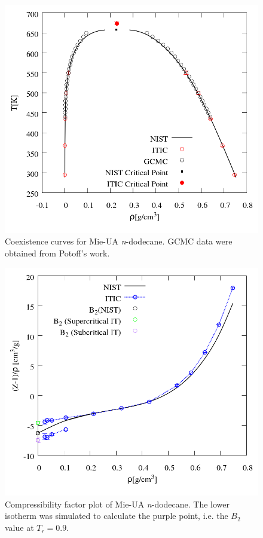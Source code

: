 \documentclass[%
 aip,
 jcp,
 sd,%
 amsmath,amssymb,
 reprint,%
]{revtex4-1}
\begin{document}
\begin{figure}
\includegraphics[scale=0.30]{Figures/EXAMPLE-SIM_Mie-C12_trho.png}
\caption{Coexistence curves for Mie-UA \textit{n}-dodecane. GCMC data were obtained from Potoff's work\cite{Potoff2009}.}
\label{fig:EXAMPLE-SIM/Mie-C12/T_rho}
\end{figure}

\begin{figure}
\includegraphics[scale=0.30]{Figures/EXAMPLE-SIM_Mie-C12_zrho.png}
\caption{Compressibility factor plot of Mie-UA \textit{n}-dodecane. The lower isotherm was simulated to calculate the purple point, i.e. the $B_2$ value at $T_r=0.9$.}
\label{fig:EXAMPLE-SIM/Mie-C12/Z_rho}
\end{figure}
\end{document}
